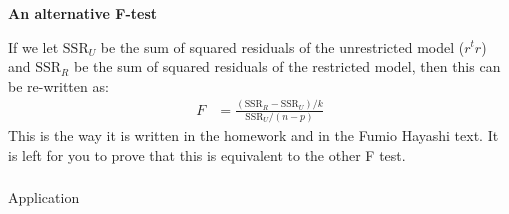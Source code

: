 \begin{frame}[fragile] \frametitle{}

{\bf An alternative F-test}

If we let $\text{SSR}_U$ be the sum of squared residuals of the unrestricted
model ($r^t r$) and $\text{SSR}_R$ be the sum of squared residuals of the
restricted model, then this can be re-written as:
\begin{align*}
F &= \frac{(\text{SSR}_R -  \text{SSR}_U) / k }{\text{SSR}_U / (n - p)}
\end{align*}
This is the way it is written in the homework and in the Fumio Hayashi
text. It is left for you to prove that this is equivalent to the
other F test.

\end{frame}

\begin{frame}[fragile] \frametitle{}

\begin{flushright}
{\color{yaleblue}\sc\fontsize{1cm}{0cm}\selectfont Application}
\end{flushright}

\end{frame}













